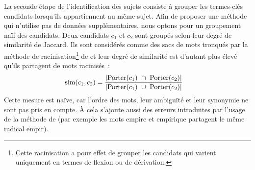         La seconde étape de l'identification des sujets consiste à grouper les
        termes-clés candidats lorsqu'ils appartiennent au même sujet. Afin de
        proposer une méthode qui n'utilise pas de données
        supplémentaires, nous optons pour un groupement naïf des
        candidats. Deux candidats $c_1$ et $c_2$ sont groupés selon leur degré
        de similarité de Jaccard. Ils sont considérés comme des sacs de
        mots tronqués par la méthode de racinisation\footnote{Cette
        racinisation a pour effet de grouper les candidats qui varient
        uniquement en termes de flexion ou de dérivation.} de
         et leur degré de similarité est
        d'autant plus élevé qu'ils partagent de mots racinisés~:
        \begin{align}
          \text{sim}(c_1, c_2) &= \frac{|\textnormal{Porter}(c_1)\ \cap\ \textnormal{Porter}(c_2)|}{|\textnormal{Porter}(c_1)\ \cup\ \textnormal{Porter}(c_2)|} \label{equa:jaccard}
        \end{align}
        Cette mesure est naïve, car l'ordre des mots, leur ambiguïté
        et leur synonymie ne sont pas pris en compte. À cela s'ajoute
        aussi des erreurs introduites par l'usage de la méthode de
         (par exemple les mots
        \og{}empire\fg{} et \og{}empirique\fg{} partagent le même radical
        \og{}empir\fg{}).

